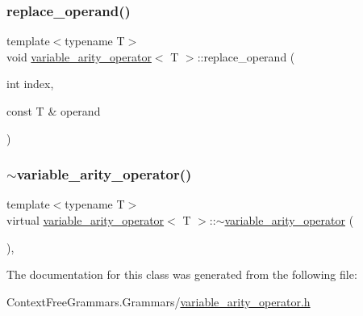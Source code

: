 \mbox{\label{classvariable__arity__operator_ad222ead15955e3b74bae9e409c25b401}} 
\subsubsection{\texorpdfstring{replace\_operand()}{replace\_operand()}}
{\footnotesize\ttfamily template$<$typename T$>$ \\
void \mbox{\hyperlink{classvariable__arity__operator}{variable\+\_\+arity\+\_\+operator}}$<$ T $>$\+::replace\+\_\+operand (\begin{DoxyParamCaption}\item[{int}]{index,  }\item[{const T \&}]{operand }\end{DoxyParamCaption})\hspace{0.3cm}{\ttfamily [inline]}}

\mbox{\label{classvariable__arity__operator_ab39270d60125d24ac74a1dbebe62a789}} 
\subsubsection{\texorpdfstring{$\sim$variable\_arity\_operator()}{~variable\_arity\_operator()}}
{\footnotesize\ttfamily template$<$typename T$>$ \\
virtual \mbox{\hyperlink{classvariable__arity__operator}{variable\+\_\+arity\+\_\+operator}}$<$ T $>$\+::$\sim$\mbox{\hyperlink{classvariable__arity__operator}{variable\+\_\+arity\+\_\+operator}} (\begin{DoxyParamCaption}{ }\end{DoxyParamCaption})\hspace{0.3cm}{\ttfamily [inline]}, {\ttfamily [virtual]}}



The documentation for this class was generated from the following file\+:\begin{DoxyCompactItemize}
\item 
Context\+Free\+Grammars.\+Grammars/\mbox{\hyperlink{variable__arity__operator_8h}{variable\+\_\+arity\+\_\+operator.\+h}}\end{DoxyCompactItemize}
